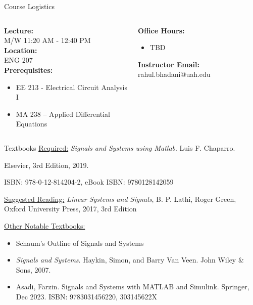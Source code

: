 \documentclass[aspectratio=169,xcolor=dvipsnames,svgnames,x11names,fleqn]{beamer}
\begin{document}

\begin{frame}{Course Logistics}
    \begin{columns}[T] %
    \begin{column}{0.5\textwidth}
        \textbf{Lecture:} \\
        M/W 11:20 AM - 12:40 PM \\
        \vspace{0.3cm}
        \textbf{Location:} \\
        ENG 207 \\
        \vspace{0.3cm}
        \textbf{Prerequisites:}
        \begin{itemize}
        \item EE 213 - Electrical Circuit Analysis I
        \item MA 238 – Applied Differential Equations
        \end{itemize}
    \end{column}
    \begin{column}{0.5\textwidth}
        \textbf{Office Hours:}
        \begin{itemize}
        \item TBD
        \end{itemize}
        \textbf{Instructor Email:} rahul.bhadani@uah.edu
    \end{column}
    \end{columns}
\end{frame}

\begin{frame}{Textbooks}
    \underline{Required:} \emph{\color{DarkGreen}Signals and Systems using Matlab}. Luis F. Chaparro. \par{\color{DarkRed}Elsevier, 3rd Edition, 2019}. \par ISBN: 978-0-12-814204-2, eBook ISBN: 9780128142059\par\vspace{5pt}

        \underline{Suggested Reading:} \textit{Linear Systems and Signals}, B. P. Lathi, Roger Green, Oxford University Press, 2017, 3rd Edition

        \underline{Other Notable Textbooks:}
        \begin{itemize}
            \item Schaum's Outline of Signals and Systems
            \item \textit{Signals and Systems}. Haykin, Simon, and Barry Van Veen. John Wiley \& Sons, 2007.
            \item Asadi, Farzin. Signals and Systems with MATLAB and Simulink. Springer, Dec 2023. ISBN: 9783031456220, 303145622X
        \end{itemize}
\end{frame}
\end{document}

